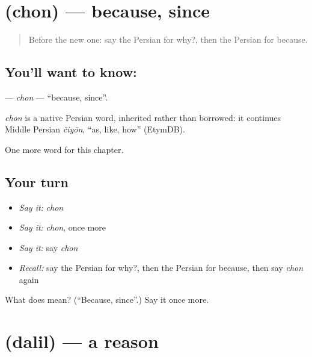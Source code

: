 \section[\texorpdfstring{\fa{چون} (chon)}{چون (chon)}]{ (chon) — because, since}

\label{lesson:FA-C92-chon}



\begin{quote}
Before the new one: say the Persian for why?, then the Persian for because.
\end{quote}

\subsection*{You'll want to know: }
\textbf{} — \emph{chon} — \textquotedblleft{}because, since\textquotedblright{}.

\begin{cousinweb}
\emph{chon} is a native Persian word, inherited rather than borrowed: it continues Middle Persian \emph{čiyōn}, \textquotedblleft{}as, like, how\textquotedblright{} (EtymDB).
\end{cousinweb}

\begin{grammarlens}[title={What you've built}]
One more word for this chapter.
\end{grammarlens}

\subsection*{Your turn}
\begin{itemize}
\raggedright
  \item \emph{Say it:} \emph{chon}
  \item \emph{Say it:} \emph{chon}, once more
  \item \emph{Say it:} say \emph{chon}
  \item \emph{Recall:} say the Persian for why?, then the Persian for because, then say \emph{chon} again
\end{itemize}

\begin{tcolorbox}[breakable,colback=teal!4,colframe=teal!35!black,title={Before you move on}]
What does  mean? (\textquotedblleft{}Because, since\textquotedblright{}.) Say it once more.
\end{tcolorbox}
\section[\texorpdfstring{\fa{دلیل} (dalil)}{دلیل (dalil)}]{ (dalil) — a reason}

